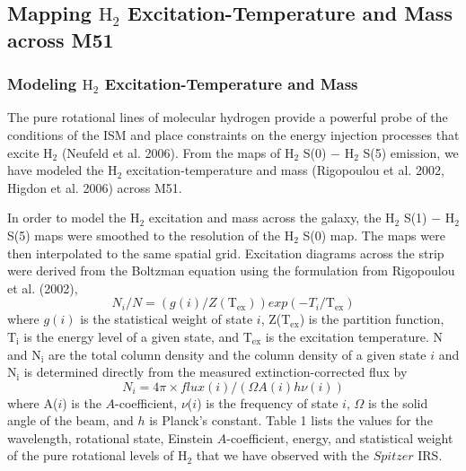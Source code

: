 \documentclass[manuscript]{aastex}
\begin{document}
\subsection{Mapping $\mathrm{H_2}$ Excitation-Temperature and Mass across M51}

\subsubsection{Modeling $\mathrm{H_2}$ Excitation-Temperature and Mass}

The pure rotational lines of molecular hydrogen provide a powerful probe of the conditions of the ISM and place constraints on the energy injection processes that excite $\mathrm{H_2}$ (Neufeld et al. 2006).  From the maps of $\mathrm{H_2}$ S(0) $-$ $\mathrm{H_2}$ S(5) emission, we have modeled the $\mathrm{H_2}$ excitation-temperature and mass (Rigopoulou et al. 2002, Higdon et al. 2006) across M51. 

In order to model the $\mathrm{H_2}$ excitation and mass across the galaxy, the $\mathrm{H_2}$ S(1) $-$ $\mathrm{H_2}$ S(5) maps were smoothed to the resolution of the $\mathrm{H_2}$ S(0) map.
The maps were then interpolated to the same spatial grid.  Excitation diagrams across the strip were derived from the Boltzman equation using the formulation from Rigopoulou et al. (2002),
\begin{equation}
N_i/N = (g(i)/Z(\mathrm{T_{ex}}))exp(-T_i/\mathrm{T_{ex}})
\end{equation}
where $g(i)$ is the statistical weight of state $i$, Z($\mathrm{T_{ex}}$) is the partition function, $\mathrm{T_i}$ is the energy level of a given state, and $\mathrm{T_{ex}}$ is the excitation temperature.  N and $\mathrm{N_i}$ are the total column density and the column density of a given state $i$ and $\mathrm{N_i}$ is determined directly from the measured extinction-corrected flux by
\begin{equation}
N_i = 4 \pi \times flux(i)/(\Omega A(i)h\nu (i))
\end{equation}
where A($i$) is the $A$-coefficient,  $\nu$($i$) is the frequency of state $i$, $\Omega$ is the solid angle of the beam, and $h$ is Planck's constant.  Table 1 lists the values for the wavelength, rotational state, Einstein $A$-coefficient, energy, and statistical weight of the pure rotational levels of $\mathrm{H_2}$ that we have observed with the $Spitzer$ IRS. 
\end{document}
